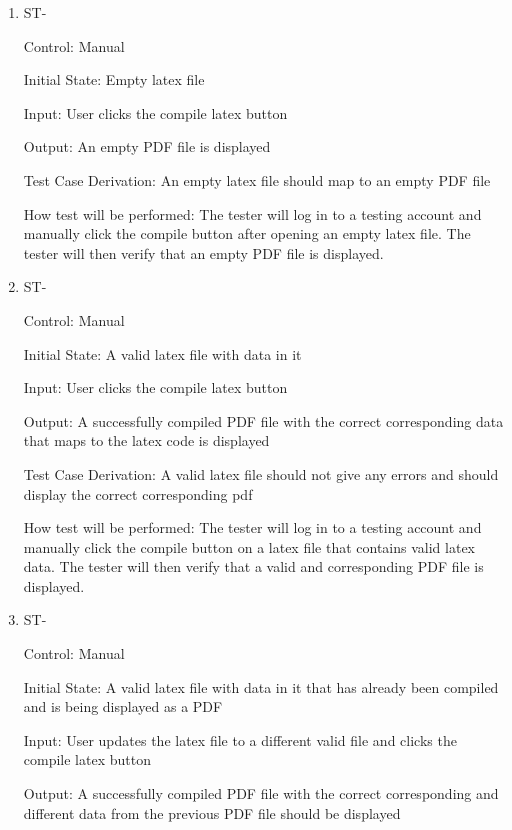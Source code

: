 \documentclass[12pt, titlepage]{article}
\newcounter{TESTID}
\newcommand\TESTNUM{\stepcounter{TESTID}\theTESTID}
\begin{document}
	\begin{enumerate}
		
		\item{ST-\TESTNUM\\}
		
		Control: Manual
		
		Initial State: Empty latex file
		
		Input: User clicks the compile latex button
		
		Output: An empty PDF file is displayed
		
		Test Case Derivation: An empty latex file should map to an empty PDF file
		
		How test will be performed: The tester will log in to a testing account and manually click the compile button after opening an empty latex file. The tester will then verify that an empty PDF file is displayed.
		
		\item{ST-\TESTNUM\\}
		
		Control: Manual
		
		Initial State: A valid latex file with data in it
		
		Input: User clicks the compile latex button
		
		Output: A successfully compiled PDF file with the correct corresponding data that maps to the latex code is displayed
		
		Test Case Derivation: A valid latex file should not give any errors and should display the correct corresponding pdf
		
		How test will be performed: The tester will log in to a testing account and manually click the compile button on a latex file that contains valid latex data. The tester will then verify that a valid and corresponding PDF file is displayed.
		
		\item{ST-\TESTNUM\\}
		
		Control: Manual
		
		Initial State: A valid latex file with data in it that has already been compiled and is being displayed as a PDF
		
		Input: User updates the latex file to a different valid file and clicks the compile latex button
		
		Output: A successfully compiled PDF file with the correct corresponding and different data from the previous PDF file should be displayed
		

\end{enumerate}
\end{document}
